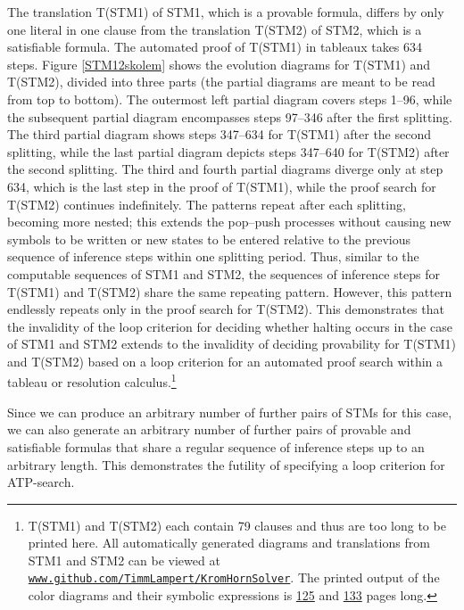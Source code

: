 \documentclass[%
  manuscript=article,   %
  year=2024,
  volume=77,
  doi=00000.000,
]{zfn}
\begin{document}
The translation T(STM1) of STM1, which is a provable formula, differs by only one literal in one clause from the translation T(STM2) of STM2, which is a satisfiable formula. The automated proof of T(STM1) in tableaux takes 634 steps. Figure \ref{STM12skolem} shows the evolution diagrams for T(STM1) and T(STM2), divided into three parts (the partial diagrams are meant to be read from top to bottom). The outermost left partial diagram covers steps 1--96, while the subsequent partial diagram encompasses steps 97--346 after the first splitting. The third partial diagram shows steps 347--634 for T(STM1) after the second splitting, while the last partial diagram depicts steps 347--640 for T(STM2) after the second splitting. The third and fourth partial diagrams diverge only at step 634, which is the last step in the proof of T(STM1), while the proof search for T(STM2) continues indefinitely. The patterns repeat after each splitting, becoming more nested; this extends the pop--push processes without causing new symbols to be written or new states to be entered relative to the previous sequence of inference steps within one splitting period. Thus, similar to the computable sequences of STM1 and STM2, the sequences of inference steps for T(STM1) and T(STM2) share the same repeating pattern. However, this pattern endlessly repeats only in the proof search for T(STM2). This demonstrates that the invalidity of the loop criterion for deciding whether halting occurs in the case of STM1 and STM2 extends to the invalidity of deciding provability for T(STM1) and T(STM2) based on a loop criterion for an automated proof search within a tableau or resolution calculus.\footnote{T(STM1) and T(STM2) each contain 79 clauses and thus are too long to be printed here. All automatically generated diagrams and translations from STM1 and STM2 can be viewed at %
\href{https://github.com/TimmLampert/KromHornSolver}{\nolinkurl{www.github.com/TimmLampert/KromHornSolver}}.%
\label{linkfoot} 
The printed output of the color diagrams and their symbolic expressions is 
\href{http://www2.cms.hu-berlin.de/newlogic/webMathematica/Logic/STM1.pdf}{125}
and 
\href{http://www2.cms.hu-berlin.de/newlogic/webMathematica/Logic/STM2.pdf}{133}
pages long.}

Since we can produce an arbitrary number of further pairs of STMs for this case, we can also generate an arbitrary number of further pairs of provable and satisfiable formulas that share a regular sequence of inference steps up to an arbitrary length. This demonstrates the futility of specifying a loop criterion for ATP-search.
\end{document}
